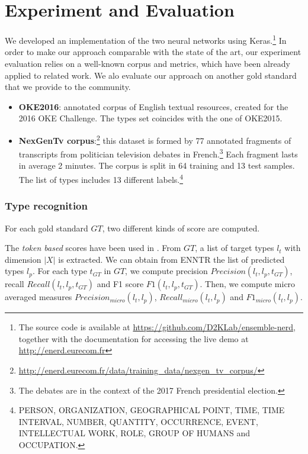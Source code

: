 \documentclass{llncs}
\begin{document}

\section{Experiment and Evaluation}
\label{sec:evaluation}
We developed an implementation of the two neural networks using Keras.\footnote{The source code is available at \url{https://github.com/D2KLab/ensemble-nerd}, together with the documentation for accessing the live demo at \url{http://enerd.eurecom.fr}}
In order to make our approach comparable with the state of the art, our experiment evaluation relies on a well-known corpus and metrics, which have been already applied to related work. We alo evaluate our approach on another gold standard that we provide to the community.
\begin{itemize}
 \item \textbf{OKE2016}: annotated corpus of English textual resources, created for the 2016 OKE Challenge. The types set coincides with the one of OKE2015.
 \item \textbf{NexGenTv corpus}:\footnote{\url{http://enerd.eurecom.fr/data/training_data/nexgen_tv_corpus/}} this dataset is formed by 77 annotated fragments of transcripts from politician television debates in French.\footnote{The debates are in the context of the 2017 French presidential election.} Each fragment lasts in average 2 minutes. The corpus is split in 64 training and 13 test samples. The list of types includes 13 different labels.\footnote{PERSON, ORGANIZATION, GEOGRAPHICAL POINT, TIME, TIME INTERVAL, NUMBER, QUANTITY, OCCURRENCE, EVENT, INTELLECTUAL WORK, ROLE, GROUP OF HUMANS and OCCUPATION.} 
\end{itemize}

\subsubsection{Type recognition}
For each gold standard $GT$, two different kinds of score are computed.

The \textit{token based} scores have been used in \cite{fox1,fox2}. From $GT$, a list of target types $l_{t}$ with dimension $\left\vert{X}\right\vert$ is extracted. We can obtain from ENNTR the list of predicted types $l_{p}$. For each type $t_{GT}$ in $GT$, we compute precision $Precision(l_{t},l_{p},t_{GT})$, recall $Recall(l_{t},l_{p},t_{GT})$ and F1 score $F1(l_{t},l_{p},t_{GT})$. Then, we compute micro averaged measures $Precision_{micro}(l_{t},l_{p})$, $Recall_{micro}(l_{t},l_{p})$ and $F1_{micro}(l_{t},l_{p})$. \cite{sebastiani2002mltext}
\end{document}

